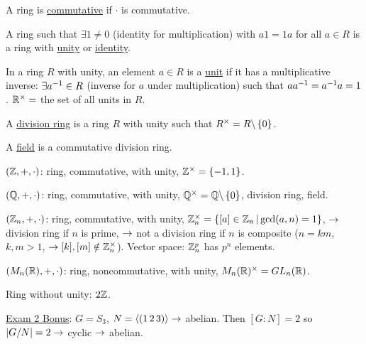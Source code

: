 \documentclass[]{article}
\begin{document}
\begin{definition}
	A ring is \ul{commutative} if $\cdot$ is commutative.
\end{definition}
\begin{definition}
	A ring such that $\exists 1\neq 0$ (identity for multiplication) with $a1=1a$ for all $a\in R$ is a ring with \ul{unity} or \ul{identity}.
\end{definition}
\begin{definition}
	In a ring $R$ with unity, an element $a\in R$ is a \ul{unit} if it has a multiplicative inverse: $\exists a^{-1}\in R$ (inverse for $a$ under multiplication) such that $aa^{-1}=a^{-1} a = 1$.
	$\mathbb{R}^\times = $ the set of all units in $R$.
\end{definition}
\begin{definition}
	A \ul{division ring} is a ring $R$ with unity such that $R^\times = R\backslash\left\{ 0 \right\}$.
\end{definition}
\begin{definition}
	A \ul{field} is a commutative division ring.
\end{definition}

\begin{example}
	$(\mathbb{Z},+,\cdot)$: ring, commutative, with unity, $\mathbb{Z}^\times=\left\{ -1,1 \right\}$.
\end{example}
\begin{example}
	$(\mathbb{Q},+,\cdot)$: ring, commutative, with unity, $\mathbb{Q}^\times=\mathbb{Q}\backslash\left\{ 0 \right\}$, division ring, field.
\end{example}
\begin{example}
	$(\mathbb{Z}_n,+,\cdot)$: ring, commutative, with unity, $\mathbb{Z}_n^\times=\left\{ [a]\in \mathbb{Z}_n \, \middle| \, \gcd(a,n)=1 \right\}$, $\rightarrow$ division ring if $n$ is prime, $\rightarrow$ not a division ring if $n$ is composite ($n=km$, $k,m>1$, $\rightarrow[k],[m]\notin\mathbb{Z}_n^\times$).
	Vector space: $\mathbb{Z}_n^p$ has $p^n$ elements.
\end{example}
\begin{example}
	$(M_n(\mathbb{R}),+,\cdot)$: ring, noncommutative, with unity, $M_n(\mathbb{R})^\times = GL_n(\mathbb{R})$.
\end{example}
\begin{example}
	Ring without unity: $2\mathbb{Z}$.
\end{example}

\ul{Exam 2 Bonus}: $G = S_3$, $N = \langle (1\,2\,3) \rangle \rightarrow$ abelian. Then $[G:N] = 2$ so $|G/N|=2 \rightarrow $ cyclic $\rightarrow$ abelian.
\end{document}
